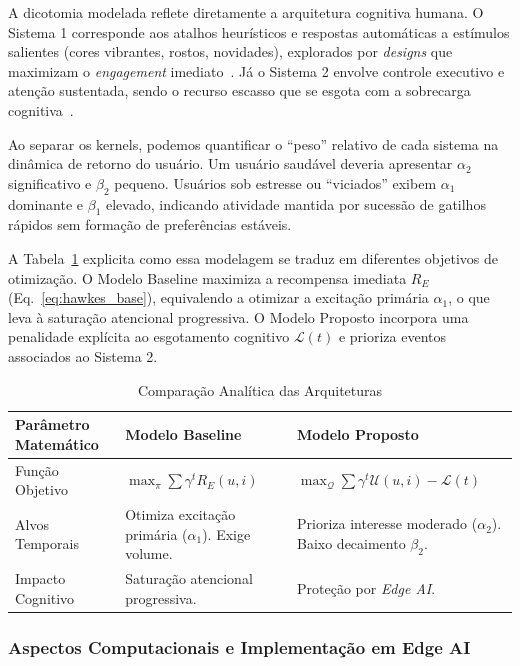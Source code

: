 \documentclass{sbc2023}
\begin{document}
A dicotomia modelada reflete diretamente a arquitetura cognitiva humana. O Sistema 1 corresponde aos atalhos heurísticos e respostas automáticas a estímulos salientes (cores vibrantes, rostos, novidades), explorados por \textit{designs} que maximizam o \textit{engagement} imediato~\citep{zuboff2019, harris2019}. Já o Sistema 2 envolve controle executivo e atenção sustentada, sendo o recurso escasso que se esgota com a sobrecarga cognitiva~\citep{paas2023}.

Ao separar os kernels, podemos quantificar o ``peso'' relativo de cada sistema na dinâmica de retorno do usuário. Um usuário saudável deveria apresentar $\alpha_2$ significativo e $\beta_2$ pequeno. Usuários sob estresse ou ``viciados'' exibem $\alpha_1$ dominante e $\beta_1$ elevado, indicando atividade mantida por sucessão de gatilhos rápidos sem formação de preferências estáveis.

A Tabela~\ref{tab:comparacao} explicita como essa modelagem se traduz em diferentes objetivos de otimização. O Modelo Baseline maximiza a recompensa imediata $R_E$ (Eq.~\ref{eq:hawkes_base}), equivalendo a otimizar a excitação primária $\alpha_1$, o que leva à saturação atencional progressiva. O Modelo Proposto incorpora uma penalidade explícita ao esgotamento cognitivo $\mathcal{L}(t)$ e prioriza eventos associados ao Sistema 2.

\begin{table}[t]
\centering
\caption{Comparação Analítica das Arquiteturas}
\label{tab:comparacao}
\begin{tabularx}{\textwidth}{@{}lXX@{}}
\toprule
\textbf{Parâmetro Matemático} & \textbf{Modelo Baseline} & \textbf{Modelo Proposto} \\ \midrule
Função Objetivo & $\max_{\pi} \sum \gamma^t R_E(u,i)$ & $\max_{\mathcal{Q}} \sum \gamma^t \mathcal{U}(u,i) - \mathcal{L}(t)$ \\
Alvos Temporais & Otimiza excitação primária ($\alpha_1$). Exige volume. & Prioriza interesse moderado ($\alpha_2$). Baixo decaimento $\beta_2$. \\
Impacto Cognitivo & Saturação atencional progressiva. & Proteção por \textit{Edge AI}. \\ \bottomrule
\end{tabularx}
\end{table}

\subsubsection{Aspectos Computacionais e Implementação em Edge AI} \label{sec:hawkes_comp}
\end{document}

